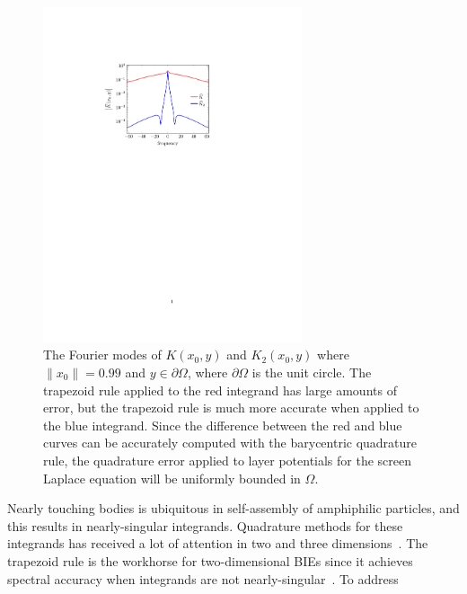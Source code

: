 \begin{figure}
\centerline{\includegraphics[width=3.0in]{figures/integrands}}
\vspace*{-13pt}
\caption{{\footnotesize The Fourier modes of $K(x_0,y)$ and $K_2(x_0,y)$
  where $\|x_0\| = 0.99$ and $y \in \partial\Omega$, where
  $\partial\Omega$ is the unit circle. The trapezoid rule applied to the
  red integrand has large amounts of error, but the trapezoid rule is
  much more accurate when applied to the blue integrand. Since the
  difference between the red and blue curves can be accurately computed
  with the barycentric quadrature rule, the quadrature error applied to
  layer potentials for the screen Laplace equation will be uniformly
  bounded in $\Omega$.}}
\label{fig:integrands}
\end{figure}
Nearly touching bodies is ubiquitous in self-assembly of amphiphilic
particles, and this results in nearly-singular integrands. Quadrature
methods for these integrands has received a lot of attention in
two and three dimensions~\cite{alpert, kapur, sidi, duffy, bruno1,
bruno2, davis_1984, graglia_2008, hackbusch_sauter_1994, jarvenpaa_2003,
khayat_2005, schwab_1992, ying_2006, beale1, beale2, goodman_1990,
haroldson_1998, lowengrub_1993, schwab_1992, ggq1, ggq2, ggq3,
helsing_2008a, helsing_integral_2009, helsing_tutorial_2012,
klockner2013jcp, qbx2, wala2019jcp, af2018sisc, siegel2018jcp,
rachh2017jcp, ding2019arxiv, bar2014}. The trapezoid rule is the
workhorse for two-dimensional BIEs since it achieves spectral accuracy
when integrands are not nearly-singular~\cite{tre-wei2014}. To address

